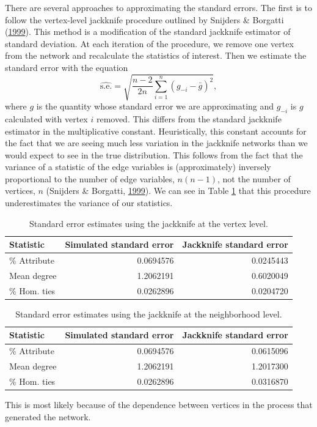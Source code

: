 \documentclass[12pt,twoside]{reedthesis}
\theoremstyle{definition}
\theoremstyle{definition}
\theoremstyle{remark}
\begin{document}
There are several approaches to approximating the standard errors. The
first is to follow the vertex-level jackknife procedure outlined by
Snijders \& Borgatti (\protect\hyperlink{ref-Snijders1999}{1999}). This
method is a modification of the standard jackknife estimator of standard
deviation. At each iteration of the procedure, we remove one vertex from
the network and recalculate the statistics of interest. Then we estimate
the standard error with the equation
\begin{equation}
\widehat{\text{s.e.}} = \sqrt{\frac{n - 2}{2n} \sum_{i = 1}^{n} (g_{-i} - \bar{g})^2},
\end{equation}
where \(g\) is the quantity whose standard error we are approximating
and \(g_{-i}\) is \(g\) calculated with vertex \(i\) removed. This
differs from the standard jackknife estimator in the multiplicative
constant. Heuristically, this constant accounts for the fact that we are
seeing much less variation in the jackknife networks than we would
expect to see in the true distribution. This follows from the fact that
the variance of a statistic of the edge variables is (approximately)
inversely proportional to the number of edge variables, \(n(n-1)\), not
the number of vertices, \(n\) (Snijders \& Borgatti,
\protect\hyperlink{ref-Snijders1999}{1999}). We can see in Table
\ref{tab:se-jack} that this procedure underestimates the variance of our
statistics.
\begin{table}

\caption{\label{tab:se-jack}Standard error estimates using the jackknife at the vertex level.}
\centering
\begin{tabular}[t]{lrr}
\toprule
Statistic & Simulated standard error & Jackknife standard error\\
\midrule
\% Attribute & 0.0694576 & 0.0245443\\
Mean degree & 1.2062191 & 0.6020049\\
\% Hom. ties & 0.0262896 & 0.0204720\\
\bottomrule
\end{tabular}
\end{table}
\begin{table}

\caption{\label{tab:se-jack2}Standard error estimates using the jackknife at the neighborhood level.}
\centering
\begin{tabular}[t]{lrr}
\toprule
Statistic & Simulated standard error & Jackknife standard error\\
\midrule
\% Attribute & 0.0694576 & 0.0615096\\
Mean degree & 1.2062191 & 1.2017300\\
\% Hom. ties & 0.0262896 & 0.0316870\\
\bottomrule
\end{tabular}
\end{table}
This is most likely because of the dependence between vertices in the
process that generated the network.
\end{document}
